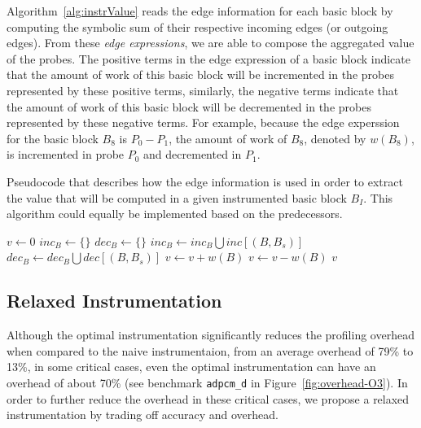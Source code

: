 \documentclass[sigplan,9pt]{acmart}
\begin{document}
Algorithm~\ref{alg:instrValue} reads the edge information for each
basic block by computing the symbolic sum of their respective incoming
edges (or outgoing edges).
From these \textit{edge expressions}, we are able to compose the aggregated
value of the probes.
The positive terms in the edge expression of a basic block indicate that the
amount of work of this basic block will be incremented in the probes represented
by these positive terms, similarly, the negative terms indicate that the amount
of work of this basic block will be decremented in the probes represented by
these negative terms.
For example, because the edge experssion for the basic block $B_8$ is
$P_0 - P_1$, the amount of work of $B_8$, denoted by $w(B_8)$,
is incremented in probe $P_0$ and decremented in $P_1$.

\begin{algorithm}[h]
  \caption{Pseudocode that describes how the edge information is used in order to extract
           the value that will be computed in a given instrumented basic block $B_I$.
           This algorithm could equally be implemented based on the predecessors.}
  \label{alg:instrValue}
  \begin{algorithmic}
	\State $v \gets 0$
	   \State $inc_B \gets \{\}$
	   \State $dec_B \gets \{\}$
	      \State $inc_B \gets inc_B \bigcup inc[(B,B_s)]$
	      \State $dec_B \gets dec_B \bigcup dec[(B,B_s)]$
	   \EndFor
	      \State $v \gets v + w(B)$
	   \EndIf
	      \State $v \gets v - w(B)$
	   \EndIf
	\EndFor
    \Return $v$
    \EndFunction
  \end{algorithmic}
\end{algorithm}

\subsection{Relaxed Instrumentation}

Although the optimal instrumentation significantly reduces the profiling overhead
when compared to the naive instrumentaion, from an average overhead of 79\% to 13\%,
in some critical cases, even the optimal instrumentation can have an overhead
of about 70\% (see benchmark \texttt{adpcm\_d} in Figure~\ref{fig:overhead-O3}).
In order to further reduce the overhead in these critical cases, we propose a relaxed instrumentation by trading off accuracy and overhead.
\end{document}
